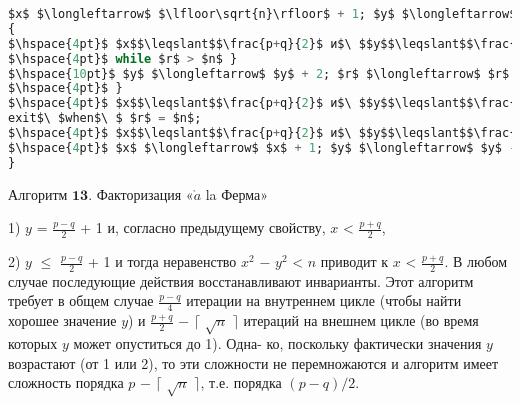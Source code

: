 \begin{lstlisting}[mathescape=true, language=Ada]
$x$ $\longleftarrow$ $\lfloor\sqrt{n}\rfloor$ + 1; $y$ $\longleftarrow$ 1 $-$ $x$ mod 2; $r$  $\longleftarrow$ $x^{2}$ $-$ $y^{2}$; 
{
$\hspace{4pt}$ $x$$\leqslant$$\frac{p+q}{2}$ и$\ $$y$$\leqslant$$\frac{p-q}{2}$$\ $имеют$\ $противоположные$\ $четности$\ $и$\ $$r$ = $x^2$ -$y^2$
$\hspace{4pt}$ while $r$ > $n$ }
$\hspace{10pt}$ $y$ $\longleftarrow$ $y$ + 2; $r$ $\longleftarrow$ $r$ - 4$y$ - 4;
$\hspace{4pt}$ }
$\hspace{4pt}$ $x$$\leqslant$$\frac{p+q}{2}$ и$\ $$y$$\leqslant$$\frac{p-q}{2}$ + 1$\ $имеют$\ $противоположные$\ $четности$\ $и$\ $$r$ = $x^2$ - $y^2$
exit$\ $when$\ $ $r$ = $n$;
$\hspace{4pt}$ $x$$\leqslant$$\frac{p+q}{2}$ и$\ $$y$$\leqslant$$\frac{p-q}{2}$ + 1$\ $имеют$\ $противоположные$\ $четности$\ $и$\ $$r$ = $x^2$ - $y^2$
$\hspace{4pt}$ $x$ $\longleftarrow$ $x$ + 1; $y$ $\longleftarrow$ $y$ - 1; $r$ $\longleftarrow$ $r$ + 2$x$ - 2$y$;
}
\end{lstlisting}

\begin{center}
$\mathbf{Алгоритм}$ $\mathbf{13.}$ Факторизация «$\grave a$ la Ферма»
\end{center}

1) $y$ = $\frac{p-q}{2}$ + 1 и, согласно предыдущему свойству, $x$ < $\frac{p+q}{2}$, \ 

\vspace{0pt} 2) $y$ $\leqslant$ $\frac{p-q}{2}$ + 1 и тогда неравенство $x^2$ $-$ $y^2$ < $n$ приводит к $x$ < $\frac{p+q}{2}$. \newline
\noindent В любом случае последующие действия восстанавливают инварианты. \linebreak
Этот алгоритм требует в общем случае $\frac{p-q}{4}$ итерации на внутреннем \linebreak
цикле (чтобы найти хорошее значение $y$) и $\frac{p+q}{2}$ $-$ $\lceil$ $\sqrt n$ $\rceil$ итераций на \linebreak
внешнем цикле (во время которых $y$ может опуститься до 1). Одна­- \linebreak
ко, поскольку фактически значения $y$ возрастают (от 1 или 2), то эти \linebreak
сложности не перемножаются и алгоритм имеет сложность порядка \linebreak
$p$ $-$ $\lceil$ $\sqrt n$ $\rceil$, т.е. порядка $(p - q)/2$.

